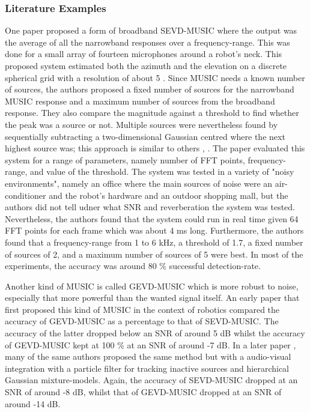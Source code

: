\documentclass{report}
\begin{document}
\subsubsection{Literature Examples}

One paper \cite{ishi_evaluation_2009} proposed a form of broadband SEVD-MUSIC where the output was the average of all the narrowband responses over a frequency-range. This was done for a small array of fourteen microphones around a robot's neck. This proposed system estimated both the azimuth and the elevation on a discrete spherical grid with a resolution of about 5 \si{\deg}. Since MUSIC needs a known number of sources, the authors proposed a fixed number of sources for the narrowband MUSIC response and a maximum number of sources from the broadband response. They also compare the magnitude against a threshold to find whether the peak was a source or not. Multiple sources were nevertheless found by sequentially subtracting a two-dimensional Gaussian centred where the next highest source was; this approach is similar to others \cite{brutti_multiple_2010}, \cite{basiri_-board_2016}. The paper evaluated this system for a range of parameters, namely number of FFT points, frequency-range, and value of the threshold. The system was tested in a variety of "noisy environments", namely an office where the main sources of noise were an air-conditioner and the robot's hardware and an outdoor shopping mall, but the authors did not tell udner what SNR and reverberation the system was tested. Nevertheless, the authors found that the system could run in real time given 64 FFT points for each frame which was about 4 \si{ms} long. Furthermore, the authors found that a frequency-range from 1 to 6 \si{kHz}, a threshold of 1.7, a fixed number of sources of 2, and a maximum number of sources of 5 were best. In most of the experiments, the accuracy was around 80 \% successful detection-rate.

Another kind of MUSIC is called GEVD-MUSIC which is more robust to noise, especially that more powerful than the wanted signal itself. An early paper \cite{nakamura_intelligent_2009} that first proposed this kind of MUSIC in the context of robotics compared the accuracy of GEVD-MUSIC as a percentage to that of SEVD-MUSIC. The accuracy of the latter dropped below an SNR of around 5 \si{dB} whilst the accuracy of GEVD-MUSIC kept at 100 \% at an SNR of around -7 \si{dB}. In a later paper \cite{nakamura_intelligent_2011}, many of the same authors proposed the same method but with a audio-visual integration with a particle filter for tracking inactive sources and hierarchical Gaussian mixture-models. Again, the accuracy of SEVD-MUSIC dropped at an SNR of around -8 \si{dB}, whilst that of GEVD-MUSIC dropped at an SNR of around -14 \si{dB}. 
\end{document}

